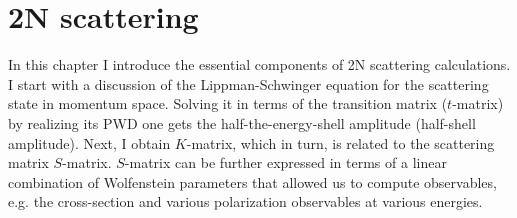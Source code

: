 

\section{2N scattering}
\label{LSE}
In this chapter I introduce the essential components of 2N scattering calculations. I start with a discussion of the Lippman-Schwinger equation for the scattering state in momentum space. Solving it in terms of the transition matrix ($t$-matrix) by realizing its PWD one gets the half-the-energy-shell amplitude (half-shell amplitude). Next, I obtain $K$-matrix, which in turn, is related to the scattering matrix $S$-matrix. $S$-matrix can be further expressed in terms of a linear combination of Wolfenstein parameters that allowed us to compute observables, e.g. the cross-section and various polarization observables at various energies.
